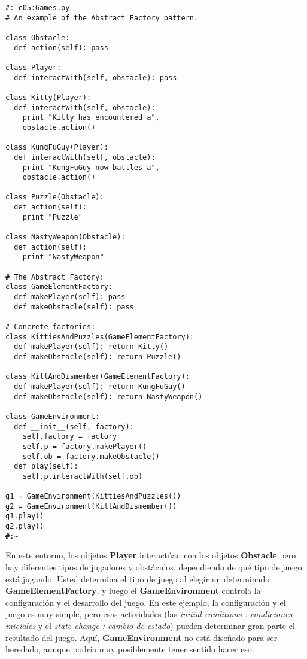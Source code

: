 \begin{lstlisting} 
#: c05:Games.py 
# An example of the Abstract Factory pattern. 

class Obstacle: 
  def action(self): pass 
  
class Player: 
  def interactWith(self, obstacle): pass 
  
class Kitty(Player): 
  def interactWith(self, obstacle): 
    print "Kitty has encountered a", 
    obstacle.action() 
    
class KungFuGuy(Player): 
  def interactWith(self, obstacle): 
    print "KungFuGuy now battles a", 
    obstacle.action() 
    
class Puzzle(Obstacle): 
  def action(self):  
    print "Puzzle"  
    
class NastyWeapon(Obstacle): 
  def action(self):  
    print "NastyWeapon"  
    
# The Abstract Factory: 
class GameElementFactory: 
  def makePlayer(self): pass 
  def makeObstacle(self): pass 
  
# Concrete factories: 
class KittiesAndPuzzles(GameElementFactory): 
  def makePlayer(self): return Kitty() 
  def makeObstacle(self): return Puzzle()   
  
class KillAndDismember(GameElementFactory): 
  def makePlayer(self): return KungFuGuy() 
  def makeObstacle(self): return NastyWeapon()
  
class GameEnvironment: 
  def __init__(self, factory): 
    self.factory = factory 
    self.p = factory.makePlayer()  
    self.ob = factory.makeObstacle() 
  def play(self):  
    self.p.interactWith(self.ob)  
    
g1 = GameEnvironment(KittiesAndPuzzles()) 
g2 = GameEnvironment(KillAndDismember()) 
g1.play()  
g2.play()  
#:~     
\end{lstlisting}

En este entorno, los objetos \textbf{Player} interactúan con los objetos \textbf{Obstacle} pero hay diferentes tipos de jugadores y obstáculos, dependiendo de qué tipo de juego está jugando. Usted determina el tipo de juego al elegir un determinado \textbf{GameElementFactory}, y luego el \textbf{GameEnvironment} controla la configuración y el desarrollo del juego. En este ejemplo, la configuración y el juego es muy simple, pero esas actividades (las \textit{initial conditions : condiciones iniciales} y el \textit{state change : cambio de estado}) pueden determinar gran parte el resultado del juego. Aquí, \textbf{GameEnvironment} no está diseñado para ser heredado, aunque podría muy posiblemente tener sentido hacer eso.      \newline

